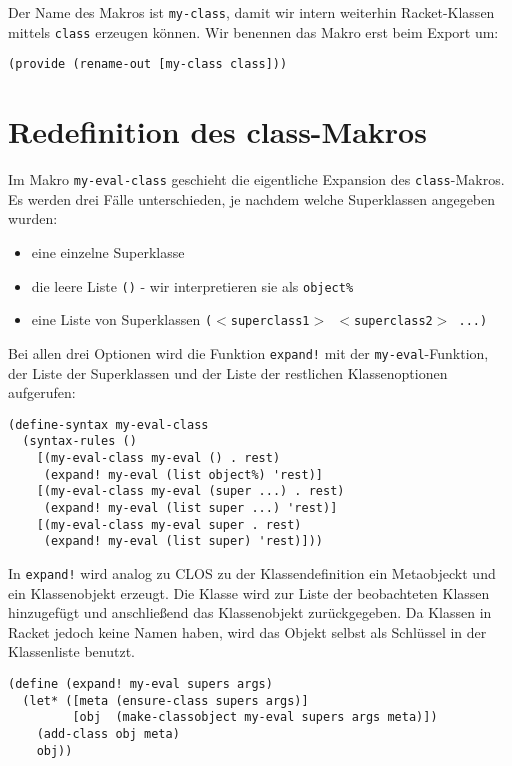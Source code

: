 Der Name des Makros ist \texttt{my-class}, damit wir intern weiterhin Racket-Klassen mittels \texttt{class} erzeugen können. Wir benennen das Makro erst beim Export um:

\begin{lstlisting}
(provide (rename-out [my-class class]))
\end{lstlisting}

\section{Redefinition des class-Makros}
Im Makro \texttt{my-eval-class} geschieht die eigentliche Expansion des \texttt{class}-Makros. Es werden drei Fälle unterschieden, je nachdem welche Superklassen angegeben wurden:
\begin{itemize}
 \item eine einzelne Superklasse 
 \item die leere Liste \texttt{()} - wir interpretieren sie als \texttt{object\%}
 \item eine Liste von Superklassen \texttt{($<$superclass1$>$ $<$superclass2$>$ ...)}
\end{itemize}

Bei allen drei Optionen wird die Funktion \texttt{expand!} mit der \texttt{my-eval}-Funktion, der Liste der Superklassen und der Liste der restlichen Klassenoptionen aufgerufen:

\begin{lstlisting}
(define-syntax my-eval-class
  (syntax-rules ()
    [(my-eval-class my-eval () . rest) 
     (expand! my-eval (list object%) 'rest)]
    [(my-eval-class my-eval (super ...) . rest)
     (expand! my-eval (list super ...) 'rest)]
    [(my-eval-class my-eval super . rest)
     (expand! my-eval (list super) 'rest)]))
\end{lstlisting}

In \texttt{expand!} wird analog zu CLOS zu der Klassendefinition ein Metaobjeckt und ein Klassenobjekt erzeugt. Die Klasse wird zur Liste der beobachteten Klassen hinzugefügt und anschließend das Klassenobjekt zurückgegeben. Da Klassen in Racket jedoch keine Namen haben, wird das Objekt selbst als Schlüssel in der Klassenliste benutzt.

\begin{lstlisting}
(define (expand! my-eval supers args)
  (let* ([meta (ensure-class supers args)]
         [obj  (make-classobject my-eval supers args meta)])
    (add-class obj meta)
    obj))
\end{lstlisting}

